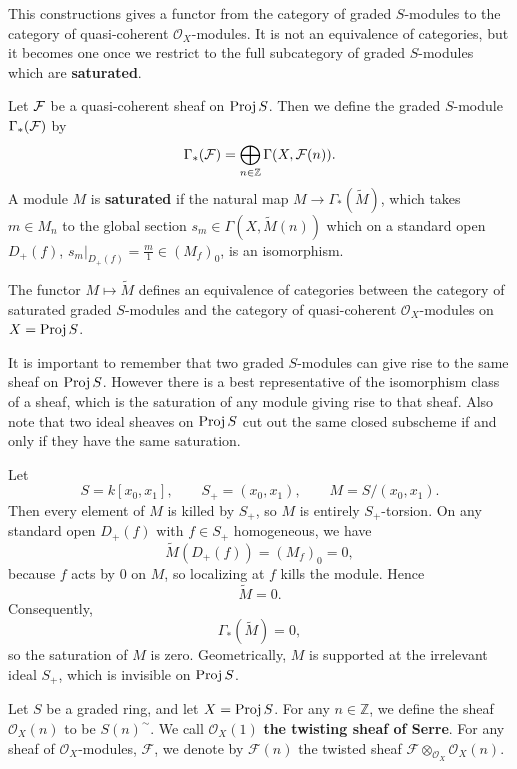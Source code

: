 \documentclass[12pt]{article}
\begin{document}
This constructions gives a functor from the category of graded $S$-modules to the category of quasi-coherent $\mathcal O_X$-modules. It is not an equivalence of categories, but it becomes one once we restrict to the full subcategory of graded $S$-modules which are \textbf{saturated}.

\begin{definition}
    Let ${\mathcal{F}}$ be a quasi-coherent sheaf on $\operatorname{Proj} S$. Then we define the graded $S$-module $\Gamma_*({\mathcal{F}})$ by
    \[
        \Gamma_*({\mathcal{F}}) = \bigoplus_{n \in \mathbb Z} \Gamma(X, {\mathcal{F}}(n)).
    \]
    A module $M$ is \textbf{saturated} if the natural map $M \to \Gamma_*(\widetilde{M})$, which takes $m \in M_n$ to the global section
    $s_m \in \Gamma(X,\widetilde M(n))$ which on a standard open $D_+(f)$,
    $s_m|_{D_+(f)} = \frac{m}{1} \in (M_f)_0$, is an isomorphism.
\end{definition}

\begin{theorem}
    The functor $M \mapsto \widetilde{M}$ defines an equivalence of categories between the category of saturated graded $S$-modules and the category of quasi-coherent $\mathcal O_X$-modules on $X = \operatorname{Proj} S$.
\end{theorem}

It is important to remember that two graded $S$-modules can give rise to the same sheaf on $\operatorname{Proj} S$. However there is a best representative of the isomorphism class of a sheaf, which is the saturation of any module giving rise to that sheaf. Also note that two ideal sheaves on $\operatorname{Proj} S$ cut out the same closed subscheme if and only if they have the same saturation.

\begin{example}
    Let
    \[
        S = k[x_0,x_1], \qquad S_+ = (x_0,x_1), \qquad M = S/(x_0,x_1).
    \]
    Then every element of $M$ is killed by $S_+$, so $M$ is entirely $S_+$-torsion. On any standard open $D_+(f)$ with $f \in S_+$ homogeneous, we have
    \[
        \widetilde M(D_+(f)) = (M_f)_0 = 0,
    \]
    because $f$ acts by $0$ on $M$, so localizing at $f$ kills the module. Hence
    \[
        \widetilde M = 0.
    \]
    Consequently,
    \[
        \Gamma_*(\widetilde M)=0,
    \]
    so the saturation of $M$ is zero. Geometrically, $M$ is supported at the irrelevant ideal $S_+$, which is invisible on $\operatorname{Proj} S$.
\end{example}

\begin{definition}
    Let $S$ be a graded ring, and let $X = \operatorname{Proj} S$. For any $n \in \mathbb Z$, we define the sheaf $\mathcal O_X(n)$ to be $S(n)^\sim$. We call $\mathcal O_X(1)$ \textbf{the twisting sheaf of Serre}. For any sheaf of $\mathcal O_X$-modules, $\mathcal F$, we denote by $\mathcal F(n)$ the twisted sheaf $\mathcal F \otimes_{\mathcal O_X} \mathcal O_X(n)$.
\end{definition}
\end{document}
